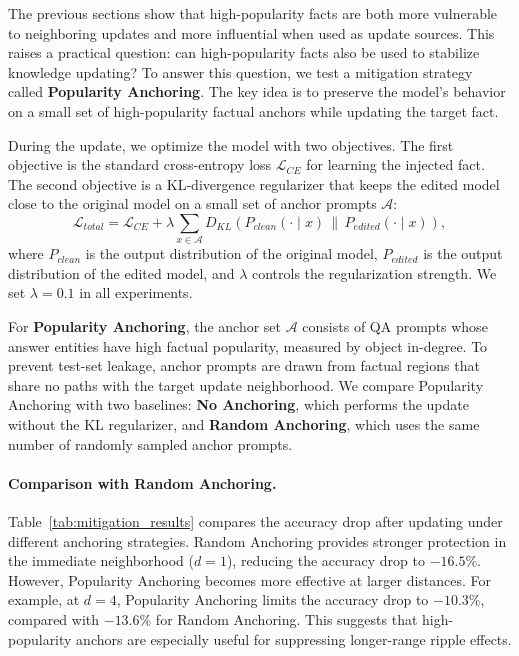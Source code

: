 The previous sections show that high-popularity facts are both more vulnerable to neighboring updates and more influential when used as update sources. This raises a practical question: can high-popularity facts also be used to stabilize knowledge updating? To answer this question, we test a mitigation strategy called \textbf{Popularity Anchoring}. The key idea is to preserve the model's behavior on a small set of high-popularity factual anchors while updating the target fact.

During the update, we optimize the model with two objectives. The first objective is the standard cross-entropy loss $\mathcal{L}_{CE}$ for learning the injected fact. The second objective is a KL-divergence regularizer that keeps the edited model close to the original model on a small set of anchor prompts $\mathcal{A}$:
\[
\mathcal{L}_{total}
=
\mathcal{L}_{CE}
+
\lambda
\sum_{x \in \mathcal{A}}
D_{KL}
\left(
P_{clean}(\cdot \mid x)
\,\|\, 
P_{edited}(\cdot \mid x)
\right),
\]
where $P_{clean}$ is the output distribution of the original model, $P_{edited}$ is the output distribution of the edited model, and $\lambda$ controls the regularization strength. We set $\lambda=0.1$ in all experiments.

For \textbf{Popularity Anchoring}, the anchor set $\mathcal{A}$ consists of QA prompts whose answer entities have high factual popularity, measured by object in-degree. To prevent test-set leakage, anchor prompts are drawn from factual regions that share no paths with the target update neighborhood. We compare Popularity Anchoring with two baselines: \textbf{No Anchoring}, which performs the update without the KL regularizer, and \textbf{Random Anchoring}, which uses the same number of randomly sampled anchor prompts.

\paragraph{Comparison with Random Anchoring.}
Table~\ref{tab:mitigation_results} compares the accuracy drop after updating under different anchoring strategies. Random Anchoring provides stronger protection in the immediate neighborhood ($d=1$), reducing the accuracy drop to $-16.5\%$. However, Popularity Anchoring becomes more effective at larger distances. For example, at $d=4$, Popularity Anchoring limits the accuracy drop to $-10.3\%$, compared with $-13.6\%$ for Random Anchoring. This suggests that high-popularity anchors are especially useful for suppressing longer-range ripple effects.


